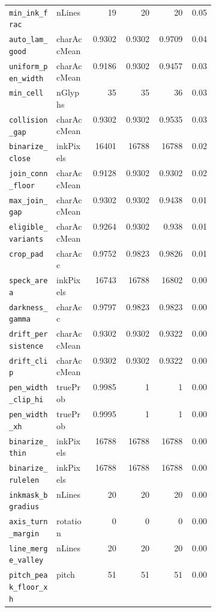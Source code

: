 \begin{longtable}{p{0.23\linewidth}p{0.17\linewidth}rrrr}
\texttt{min\_ink\_frac} & \textsf{nLines} & 19 & 20 & 20 & 0.05 \\
\texttt{auto\_lam\_good} & \textsf{charAccMean} & 0.9302 & 0.9302 & 0.9709 & 0.04 \\
\texttt{uniform\_pen\_width} & \textsf{charAccMean} & 0.9186 & 0.9302 & 0.9457 & 0.03 \\
\texttt{min\_cell} & \textsf{nGlyphs} & 35 & 35 & 36 & 0.03 \\
\texttt{collision\_gap} & \textsf{charAccMean} & 0.9302 & 0.9302 & 0.9535 & 0.03 \\
\texttt{binarize\_close} & \textsf{inkPixels} & 16401 & 16788 & 16788 & 0.02 \\
\texttt{join\_conn\_floor} & \textsf{charAccMean} & 0.9128 & 0.9302 & 0.9302 & 0.02 \\
\texttt{max\_join\_gap} & \textsf{charAccMean} & 0.9302 & 0.9302 & 0.9438 & 0.01 \\
\texttt{eligible\_variants} & \textsf{charAccMean} & 0.9264 & 0.9302 & 0.938 & 0.01 \\
\texttt{crop\_pad} & \textsf{charAcc} & 0.9752 & 0.9823 & 0.9826 & 0.01 \\
\texttt{speck\_area} & \textsf{inkPixels} & 16743 & 16788 & 16802 & 0.00 \\
\texttt{darkness\_gamma} & \textsf{charAcc} & 0.9797 & 0.9823 & 0.9823 & 0.00 \\
\texttt{drift\_persistence} & \textsf{charAccMean} & 0.9302 & 0.9302 & 0.9322 & 0.00 \\
\texttt{drift\_clip} & \textsf{charAccMean} & 0.9302 & 0.9302 & 0.9322 & 0.00 \\
\texttt{pen\_width\_clip\_hi} & \textsf{trueProb} & 0.9985 & 1 & 1 & 0.00 \\
\texttt{pen\_width\_xh} & \textsf{trueProb} & 0.9995 & 1 & 1 & 0.00 \\
\texttt{binarize\_thin} & \textsf{inkPixels} & 16788 & 16788 & 16788 & 0.00 \\
\texttt{binarize\_rulelen} & \textsf{inkPixels} & 16788 & 16788 & 16788 & 0.00 \\
\texttt{inkmask\_bgradius} & \textsf{nLines} & 20 & 20 & 20 & 0.00 \\
\texttt{axis\_turn\_margin} & \textsf{rotation} & 0 & 0 & 0 & 0.00 \\
\texttt{line\_merge\_valley} & \textsf{nLines} & 20 & 20 & 20 & 0.00 \\
\texttt{pitch\_peak\_floor\_xh} & \textsf{pitch} & 51 & 51 & 51 & 0.00 \\

\end{longtable}
